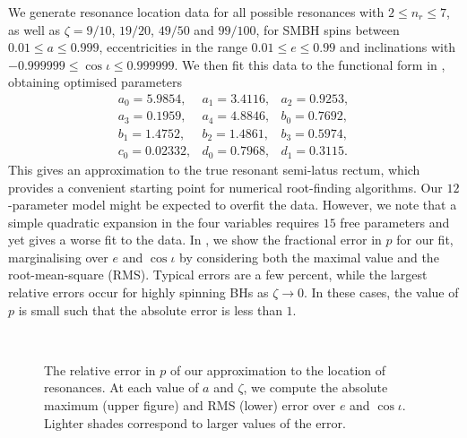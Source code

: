 We generate resonance location data for all possible resonances with $2 \leq n_r \leq 7$, as well as $\zeta = 9/10$, $19/20$, $49/50$ and $99/100$, for SMBH spins between $0.01 \leq a \leq 0.999$, eccentricities in the range $0.01 \leq e \leq 0.99$ and inclinations with $-0.999999 \leq \cos\iota \leq 0.999999$. We then fit this data to the functional form in , obtaining optimised parameters
\begin{equation}
\begin{array}{lll}
a_0 = 5.9854, & a_1 = 3.4116, & a_2 = 0.9253,\\
a_3 = 0.1959, & a_4 = 4.8846, & b_0 = 0.7692,\\
b_1 = 1.4752, & b_2 = 1.4861, & b_3 = 0.5974,\\
c_0 = 0.02332, & d_0 = 0.7968, & d_1 = 0.3115.
\end{array}
\end{equation}
This gives an approximation to the true resonant semi-latus rectum, which provides a convenient starting point for numerical root-finding algorithms. Our $12$-parameter model might be expected to overfit the data. However, we note that a simple quadratic expansion in the four variables requires $15$ free parameters and yet gives a worse fit to the data. In , we show the fractional error in $p$ for our fit, marginalising over $e$ and $\cos\iota$ by considering both the maximal value and the root-mean-square (RMS). Typical errors are a few percent, while the largest relative errors occur for highly spinning BHs as $\zeta\rightarrow 0$. In these cases, the value of $p$ is small such that the absolute error is less than $1$.

\begin{figure}[htbp]
\centering
{}\\
\caption{\label{fig:res-reserror}The relative error in $p$ of our approximation to the location of resonances. At each value of $a$ and $\zeta$, we compute the absolute maximum (upper figure) and RMS (lower) error over $e$ and $\cos\iota$. Lighter shades correspond to larger values of the error.}
\end{figure}



